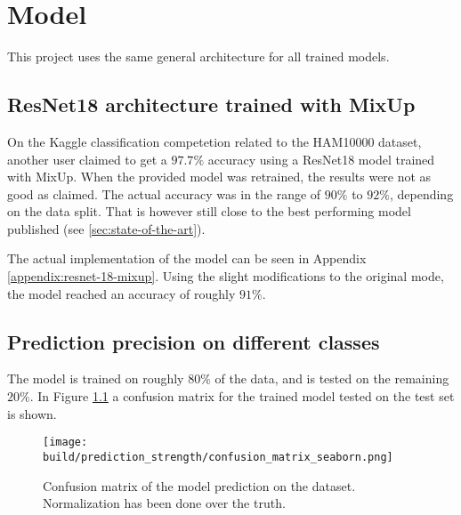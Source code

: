 \chapter{Model}\label{sec:model}
This project uses the same general architecture for all trained models.

\section{ResNet18 architecture trained with MixUp}
On the Kaggle classification competetion related to the HAM10000 dataset\cite{HAM10000-kaggle-competetion},
another user claimed to get a $97.7\%$ accuracy using a ResNet18 model trained with MixUp\cite{kaggle-97-model}.
When the provided model was retrained, the results were not as good as claimed.
The actual accuracy was in the range of $90\%$ to $92\%$, depending on the data split.
That is however still close to the best performing model published (see \ref{sec:state-of-the-art}).

The actual implementation of the model can be seen in Appendix \ref{appendix:resnet-18-mixup}.
Using the slight modifications to the original mode, the model reached an accuracy of roughly $91\%$.

\section{Prediction precision on different classes}
The model is trained on roughly $80\%$ of the data, and is tested on the remaining $20\%$.
In Figure \ref{fig:prediction_strength} a confusion matrix for the trained model tested on the test set is shown.

\begin{figure}[ht]
    \centering
    \texttt{[image: build/prediction\_strength/confusion\_matrix\_seaborn.png]}
    \caption{Confusion matrix of the model prediction on the dataset. 
        Normalization has been done over the truth.
    }
    \label{fig:prediction_strength}
\end{figure}